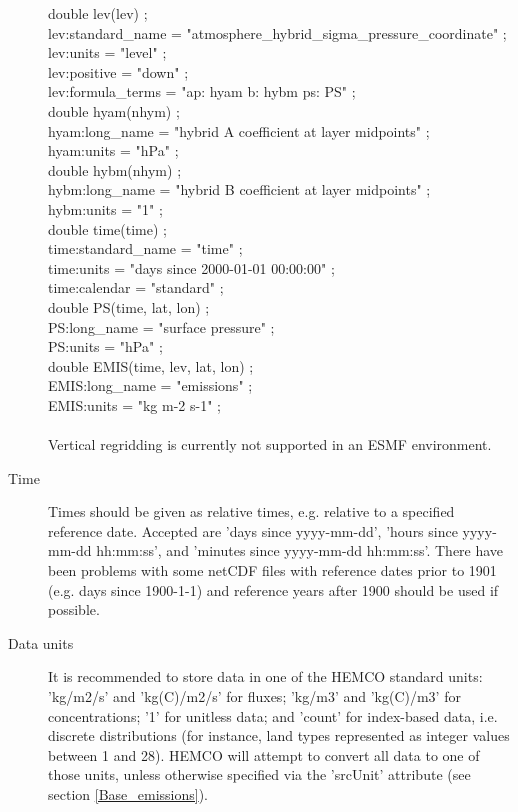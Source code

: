 \documentclass[12pt,a4paper]{article} %
\begin{document}
\begin{description}
double lev(lev) ;\\
       lev:standard\_name = "atmosphere\_hybrid\_sigma\_pressure\_coordinate" ;\\
       lev:units = "level" ;\\
       lev:positive = "down" ;\\
       lev:formula\_terms = "ap: hyam b: hybm ps: PS" ;\\
double hyam(nhym) ;\\
       hyam:long\_name = "hybrid A coefficient at layer midpoints" ;\\
       hyam:units = "hPa" ;\\
double hybm(nhym) ;\\
       hybm:long\_name = "hybrid B coefficient at layer midpoints" ;\\
       hybm:units = "1" ;\\
double time(time) ;\\
       time:standard\_name = "time" ;\\
       time:units = "days since 2000-01-01 00:00:00" ;\\
       time:calendar = "standard" ;\\
double PS(time, lat, lon) ;\\
       PS:long\_name = "surface pressure" ;\\
       PS:units = "hPa" ;\\
double EMIS(time, lev, lat, lon) ;\\
       EMIS:long\_name = "emissions" ;\\
       EMIS:units = "kg m-2 s-1" ;\\
\\
Vertical regridding is currently not supported in an ESMF environment. 
\item [Time] Times should be given as relative times, e.g. relative to a specified reference date. Accepted are 'days since yyyy-mm-dd', 'hours since yyyy-mm-dd hh:mm:ss', and 'minutes since yyyy-mm-dd hh:mm:ss'. There have been problems with some netCDF files with reference dates prior to 1901 (e.g. days since 1900-1-1) and reference years after 1900 should be used if possible.
\item [Data units] It is recommended to store data in one of the HEMCO standard units: 'kg/m2/s' and 'kg(C)/m2/s' for fluxes; 'kg/m3' and 'kg(C)/m3' for concentrations; '1' for unitless data; and 'count' for index-based data, i.e. discrete distributions (for instance, land types represented as integer values between 1 and 28). HEMCO will attempt to convert all data to one of those units, unless otherwise specified via the 'srcUnit' attribute (see section \ref{Base_emissions}).\\

\end{description}
\end{document}
